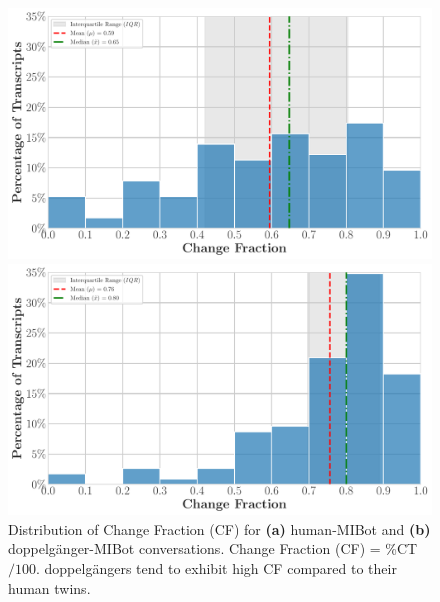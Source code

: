 \begin{figure}[ht!]
    \centering
    \begin{minipage}{0.8\textwidth}
        \centering
        \includegraphics[width=\linewidth]{fig/change_frac_human_histogram.pdf}
    \end{minipage}\vfill
    \begin{minipage}{0.8\textwidth}
        \centering
        \includegraphics[width=\linewidth]{fig/change_frac_histogram.pdf}
    \end{minipage}
    \caption{Distribution of Change Fraction (CF) for \textbf{(a)} human-MIBot and \textbf{(b)} doppelgänger-MIBot conversations. Change Fraction (CF) = \%CT$/100$. doppelgängers tend to exhibit high CF compared to their human twins.}
    \label{fig:cf_comparison}
\end{figure}


